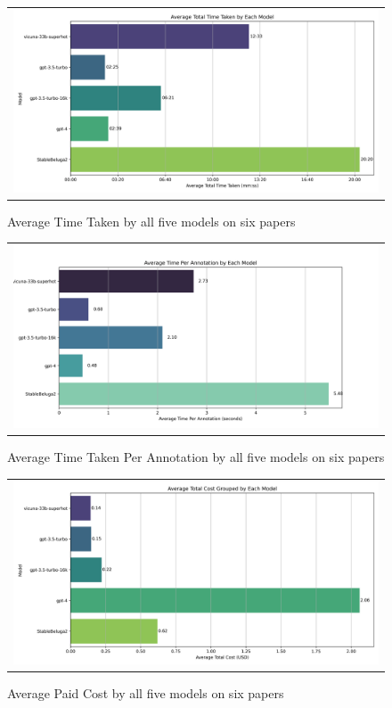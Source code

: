 \begin{figure}[htpb]
  \centering
  \begin{tabular}{c}
  \includegraphics[width=14cm]{images/open-runtime.png}
  \end{tabular}
  \caption[Open Source Time]{Average Time Taken by all five models on six papers}\label{fig:open-runtime}
\end{figure}

\begin{figure}[htpb]
  \centering
  \begin{tabular}{c}
  \includegraphics[width=14cm]{images/open-anno-cost.png}
  \end{tabular}
  \caption[Open Source Cost]{Average Time Taken Per Annotation by all five models on six papers}\label{fig:open-relative-cost}
\end{figure}

\begin{figure}[htpb]
  \centering
  \begin{tabular}{c}
  \includegraphics[width=14cm]{images/open-cost.png}
  \end{tabular}
  \caption[Open Source Time]{Average Paid Cost by all five models on six papers}\label{fig:open-cost}
\end{figure}

